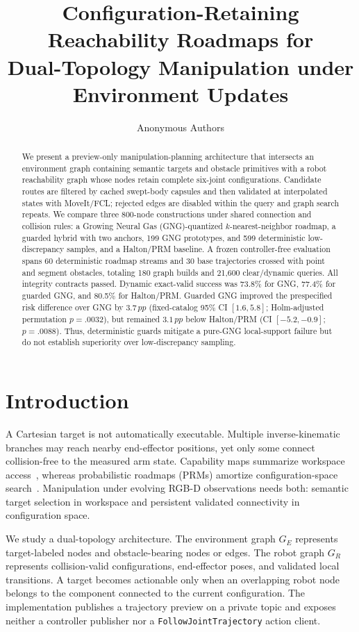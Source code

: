 \documentclass[letterpaper,10pt,conference]{ieeeconf}
\title{\LARGE \bf
Configuration-Retaining Reachability Roadmaps for\\
Dual-Topology Manipulation under Environment Updates
}
\author{Anonymous Authors}
\newcommand{\pp}{\,pp}
\begin{document}
\maketitle
\thispagestyle{empty}
\pagestyle{empty}
\balance

\begin{abstract}
We present a preview-only manipulation-planning architecture that intersects an environment graph containing semantic targets and obstacle primitives with a robot reachability graph whose nodes retain complete six-joint configurations. Candidate routes are filtered by cached swept-body capsules and then validated at interpolated states with MoveIt/FCL; rejected edges are disabled within the query and graph search repeats. We compare three 800-node constructions under shared connection and collision rules: a Growing Neural Gas (GNG)-quantized $k$-nearest-neighbor roadmap, a guarded hybrid with two anchors, 199 GNG prototypes, and 599 deterministic low-discrepancy samples, and a Halton/PRM baseline. A frozen controller-free evaluation spans 60 deterministic roadmap streams and 30 base trajectories crossed with point and segment obstacles, totaling 180 graph builds and 21,600 clear/dynamic queries. All integrity contracts passed. Dynamic exact-valid success was 73.8\% for GNG, 77.4\% for guarded GNG, and 80.5\% for Halton/PRM. Guarded GNG improved the prespecified risk difference over GNG by $3.7\pp$ (fixed-catalog 95\% CI $[1.6,5.8]$; Holm-adjusted permutation $p=.0032$), but remained $3.1\pp$ below Halton/PRM (CI $[-5.2,-0.9]$; $p=.0088$). Thus, deterministic guards mitigate a pure-GNG local-support failure but do not establish superiority over low-discrepancy sampling.
\end{abstract}

\section{Introduction}
A Cartesian target is not automatically executable. Multiple inverse-kinematic branches may reach nearby end-effector positions, yet only some connect collision-free to the measured arm state. Capability maps summarize workspace access~\cite{zacharias2007,porges2014}, whereas probabilistic roadmaps (PRMs) amortize configuration-space search~\cite{kavraki1996}. Manipulation under evolving RGB-D observations needs both: semantic target selection in workspace and persistent validated connectivity in configuration space.

We study a dual-topology architecture. The environment graph $G_E$ represents target-labeled nodes and obstacle-bearing nodes or edges. The robot graph $G_R$ represents collision-valid configurations, end-effector poses, and validated local transitions. A target becomes actionable only when an overlapping robot node belongs to the component connected to the current configuration. The implementation publishes a trajectory preview on a private topic and exposes neither a controller publisher nor a \texttt{FollowJointTrajectory} action client.
\end{document}
